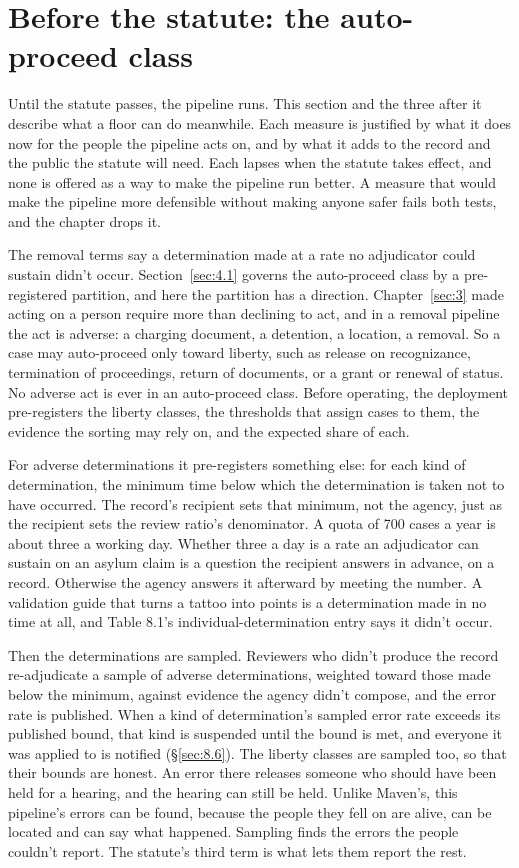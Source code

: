 \section{Before the statute: the auto-proceed class}
\label{sec:8.5}
Until the statute passes, the pipeline runs. This section and the three after it describe what a floor can do meanwhile. Each measure is justified by what it does now for the people the pipeline acts on, and by what it adds to the record and the public the statute will need. Each lapses when the statute takes effect, and none is offered as a way to make the pipeline run better. A measure that would make the pipeline more defensible without making anyone safer fails both tests, and the chapter drops it.

The removal terms say a determination made at a rate no adjudicator could sustain didn't occur. Section~\ref{sec:4.1} governs the auto-proceed class by a pre-registered partition, and here the partition has a direction. Chapter~\ref{sec:3} made acting on a person require more than declining to act, and in a removal pipeline the act is adverse: a charging document, a detention, a location, a removal. So a case may auto-proceed only toward liberty, such as release on recognizance, termination of proceedings, return of documents, or a grant or renewal of status. No adverse act is ever in an auto-proceed class. Before operating, the deployment pre-registers the liberty classes, the thresholds that assign cases to them, the evidence the sorting may rely on, and the expected share of each.

For adverse determinations it pre-registers something else: for each kind of determination, the minimum time below which the determination is taken not to have occurred. The record's recipient sets that minimum, not the agency, just as the recipient sets the review ratio's denominator. A quota of 700 cases a year is about three a working day. Whether three a day is a rate an adjudicator can sustain on an asylum claim is a question the recipient answers in advance, on a record. Otherwise the agency answers it afterward by meeting the number. A validation guide that turns a tattoo into points is a determination made in no time at all, and Table 8.1's individual-determination entry says it didn't occur.

Then the determinations are sampled. Reviewers who didn't produce the record re-adjudicate a sample of adverse determinations, weighted toward those made below the minimum, against evidence the agency didn't compose, and the error rate is published. When a kind of determination's sampled error rate exceeds its published bound, that kind is suspended until the bound is met, and everyone it was applied to is notified (\S\ref{sec:8.6}). The liberty classes are sampled too, so that their bounds are honest. An error there releases someone who should have been held for a hearing, and the hearing can still be held. Unlike Maven's, this pipeline's errors can be found, because the people they fell on are alive, can be located and can say what happened. Sampling finds the errors the people couldn't report. The statute's third term is what lets them report the rest.
